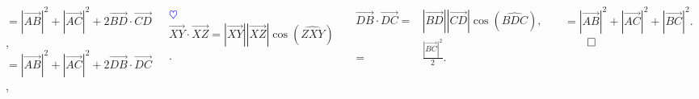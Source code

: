 \documentclass[10pt]{beamer}
\def \heart {\textcolor{blue}{$\heartsuit$} }
\def\cos{\operatorname{cos}}
\newcommand{\vect}[1] {
  \overrightarrow{#1}}
\begin{document}
{\begin{columns}[t]
		$=|\vect{AB}|^2 + |\vect{AC}|^2 +2\vect{BD}\cdot\vect{CD}$, \\ \medskip
		$=|\vect{AB}|^2 + |\vect{AC}|^2 +2\vect{DB}\cdot\vect{DC}$, \\ \bigskip
		
		\heart $\vect{XY}\cdot\vect{XZ}=|\vect{XY}||\vect{XZ}|\cos(\widehat{ZXY})$. \\ \bigskip
		
		\begin{align*}
		\vect{DB}\cdot\vect{DC}=&|\vect{BD}||\vect{CD}|\cos(\widehat{BDC}), \\
				       =&\frac{|\vect{BC}|^2}{2}.
		\end{align*} \bigskip
		
		$=|\vect{AB}|^2 + |\vect{AC}|^2 + |\vect{BC}|^2$. \hfill $\qed$
		

	   \end{columns}
   
    }
  
\end{document}
